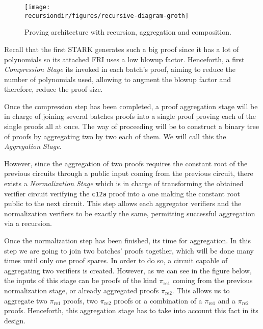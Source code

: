 \begin{figure}[H]
\centering
\texttt{[image: \\recursiondir/figures/recursive-diagram-groth]}
\caption{Proving architecture with recursion, aggregation and composition.}
\label{fig:architecture-aggregation-recursion-composition}
\end{figure}

Recall that the first STARK generates such a big proof since it has a lot of polynomials so its attached FRI uses a low blowup factor. Henceforth, a first \textit{Compression Stage} its invoked in each batch's proof, aiming to reduce the number of polynomials used, allowing to augment the blowup factor and therefore, reduce the proof size.  

Once the compression step has been completed, a proof aggregation stage will be in charge of joining several batches proofs into a single proof proving each of the single proofs all at once. The way of proceeding will be to construct a binary tree of proofs by aggregating two by two each of them. We will call this the \textit{Aggregation Stage}. 


However, since the aggregation of two proofs requires the constant root of the previous circuits through a public input coming from the previous circuit, there exists a \textit{Normalization Stage} which is in charge of transforming the obtained verifier circuit verifying the \texttt{c12a} proof into a one making the constant root public to the next circuit. This step allows each aggregator verifiers and the normalization verifiers to be exactly the same, permitting successful aggregation via a recursion. 

Once the normalization step has been finished, its time for aggregation. In this step we are going to join two batches' proofs together, which will be done many times until only one proof spares. In order to do so, a circuit capable of aggregating two verifiers is created. However, as we can see in the figure below, the inputs of this stage can be proofs of the kind $\pi_{\text{re1}}$ coming from the previous normalization stage, or  already aggregated proofs $\pi_{\text{re2}}$. This allows us to aggregate two $\pi_{\text{re1}}$ proofs, two $\pi_{\text{re2}}$ proofs or a combination of a $\pi_{\text{re1}}$ and a $\pi_{\text{re2}}$ proofs. Henceforth, this aggregation stage has to take into account this fact in its design. 


